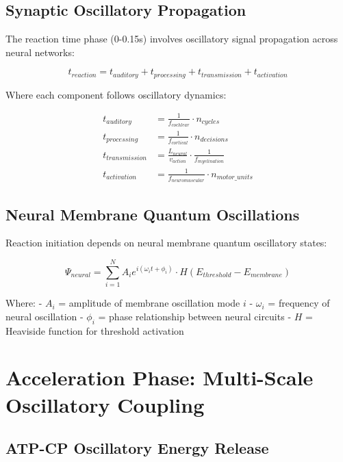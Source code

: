\documentclass[12pt]{article}
\begin{document}
\subsection{Synaptic Oscillatory Propagation}

The reaction time phase (0-0.15s) involves oscillatory signal propagation across neural networks:

\begin{equation}
t_{reaction} = t_{auditory} + t_{processing} + t_{transmission} + t_{activation}
\end{equation}

Where each component follows oscillatory dynamics:

\begin{align}
t_{auditory} &= \frac{1}{f_{cochlear}} \cdot n_{cycles} \\
t_{processing} &= \frac{1}{f_{cortical}} \cdot n_{decisions} \\
t_{transmission} &= \frac{L_{neural}}{v_{action}} \cdot \frac{1}{f_{myelination}} \\
t_{activation} &= \frac{1}{f_{neuromuscular}} \cdot n_{motor\_units}
\end{align}

\subsection{Neural Membrane Quantum Oscillations}

Reaction initiation depends on neural membrane quantum oscillatory states:

\begin{equation}
\Psi_{neural} = \sum_{i=1}^{N} A_i e^{i(\omega_i t + \phi_i)} \cdot H(E_{threshold} - E_{membrane})
\end{equation}

Where:
- $A_i$ = amplitude of membrane oscillation mode $i$
- $\omega_i$ = frequency of neural oscillation
- $\phi_i$ = phase relationship between neural circuits
- $H$ = Heaviside function for threshold activation

\section{Acceleration Phase: Multi-Scale Oscillatory Coupling}

\subsection{ATP-CP Oscillatory Energy Release}
\end{document}
